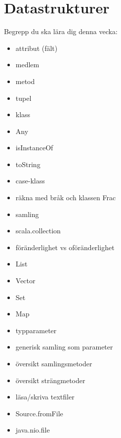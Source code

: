 \chapter{Datastrukturer}\label{chapter:W04}
Begrepp du ska lära dig denna vecka:
\begin{itemize}[noitemsep,label={$\square$},leftmargin=*]
\item attribut (fält)
\item medlem
\item metod
\item tupel
\item klass
\item Any
\item isInstanceOf
\item toString
\item case-klass
\item räkna med bråk och klassen Frac
\item samling
\item scala.collection
\item föränderlighet vs oföränderlighet
\item List
\item Vector
\item Set
\item Map
\item typparameter
\item generisk samling som parameter
\item översikt samlingsmetoder
\item översikt strängmetoder
\item läsa/skriva textfiler
\item Source.fromFile
\item java.nio.file\end{itemize}
